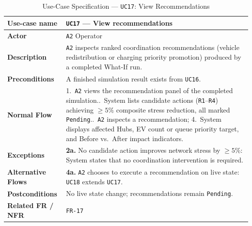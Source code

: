 \begin{table}[H]
  \centering
  \singlespacing\footnotesize
  \caption{Use-Case Specification --- \texttt{UC17}: View Recommendations}
  \label{tab:uc17}
  \renewcommand{\arraystretch}{1.13}
  \begin{tabularx}{\textwidth}{|L{2.9cm}|Y|}
    \hline
    \textbf{Use-case name} & \textbf{\texttt{UC17} --- View recommendations} \\
    \hline
    \textbf{Actor} & \texttt{A2} Operator \\
    \hline
    \textbf{Description} & \texttt{A2} inspects ranked coordination recommendations (vehicle redistribution or charging priority promotion) produced by a completed What-If run. \\
    \hline
    \textbf{Preconditions} & A finished simulation result exists from \texttt{UC16}. \\
    \hline
    \textbf{Normal Flow} & 1.\ \texttt{A2} views the recommendation panel of the completed simulation..\ System lists candidate actions (\texttt{R1}--\texttt{R4}) achieving $\ge 5\%$ composite stress reduction, all marked \texttt{Pending}..\ \texttt{A2} inspects a recommendation; 4.\ System displays affected Hubs, EV count or queue priority target, and Before vs.\ After impact indicators. \\
    \hline
    \textbf{Exceptions} & \textbf{2a.} No candidate action improves network stress by $\ge 5\%$: System states that no coordination intervention is required. \\
    \hline
    \textbf{Alternative Flows} & \textbf{4a.} \texttt{A2} chooses to execute a recommendation on live state: \texttt{UC18} extends \texttt{UC17}. \\
    \hline
    \textbf{Postconditions} & No live state change; recommendations remain \texttt{Pending}. \\
    \hline
    \textbf{Related FR / NFR} & \texttt{FR-17} \\
    \hline
  \end{tabularx}
\end{table}

